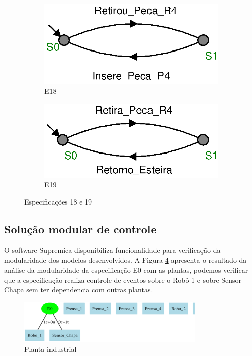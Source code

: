 \begin{figure}[H]%
  \centering
  \begin{subfigure}{0.45\textwidth}
      \centering
      \includegraphics[width=\textwidth]{imagens/E18.eps}
      \caption{E18}
      \label{fig:e18}
  \end{subfigure}
  \hfill
  \begin{subfigure}{0.45\textwidth}
      \centering
      \includegraphics[width=\textwidth]{imagens/E19.eps}
      \caption{E19}
      \label{fig:e19}
  \end{subfigure}
  \caption{Especificações 18 e 19}
  \label{fig:e1819}
\end{figure}

\subsection{Solução modular de controle}
O software Supremica \cite{Supremica2020} disponibiliza funcionalidade para verificação da modularidade dos modelos desenvolvidos.
A Figura \ref{fig:modulare0} apresenta o resultado da análise da modularidade da especificação E0 com as plantas, podemos verificar que a especificação realiza controle de eventos sobre o Robô 1 e sobre Sensor Chapa sem ter dependencia com outras plantas.

\begin{figure}[H]%
  \centering
  \includegraphics[width=0.8\textwidth]{imagens/modular_E0.eps}
  \caption{Planta industrial}\label{fig:modulare0}
\end{figure}

